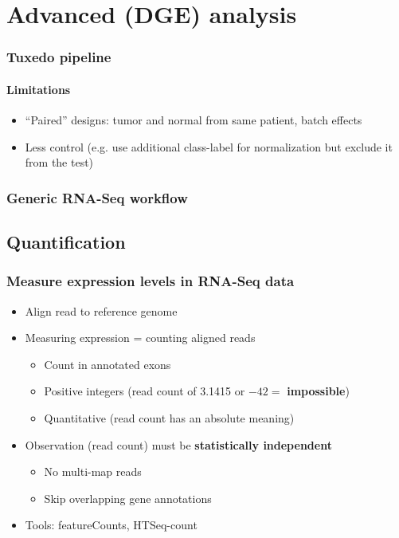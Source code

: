 \documentclass{beamer}			  %
\begin{document}
\section{Advanced (DGE) analysis}

\begin{frame}
\frametitle{Tuxedo pipeline}
\framesubtitle{Limitations}
	\begin{itemize}
		\item ``Paired'' designs: tumor and normal from same patient, batch effects
		\item Less control (e.g. use additional class-label for normalization but exclude it from the test)
	\end{itemize}
\end{frame}

\begin{frame}
\frametitle{Generic RNA-Seq workflow}
	\begin{center}
	\end{center}
\end{frame}


\subsection{Quantification}
\begin{frame}
	\frametitle{Measure expression levels in RNA-Seq data}
	\begin{itemize}
			\item Align read to reference genome
		\item Measuring expression = counting aligned reads
		\begin{itemize}
				\item Count in annotated exons
			\item Positive integers (read count of 3.1415 or $-42 = $ \textbf{impossible})
			\item Quantitative (read count has an absolute meaning)
		\end{itemize}
		\item Observation (read count) must be \textbf{statistically independent}
		\begin{itemize}
			\item No multi-map reads
			\item Skip overlapping gene annotations
		\end{itemize}
	\end{itemize}
	
	\begin{figure}
	\end{figure}
	\begin{itemize}
		\item Tools: featureCounts, HTSeq-count \cite{featurecounts,htseq}
	\end{itemize}
\end{frame}
\end{document}
